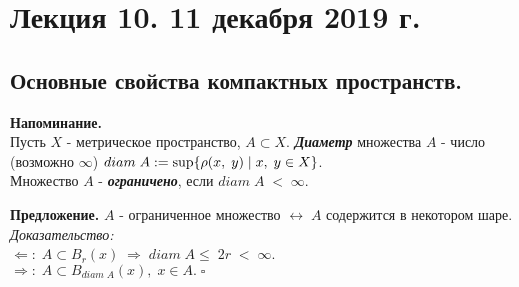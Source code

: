 \documentclass[../../main.tex]{subfiles}
\begin{document}
\section{Лекция 10. 11 декабря 2019 г.}

\subsection{Основные свойства компактных пространств.}
\textbf{Напоминание.}\\
Пусть $X$ - метрическое пространство, $A\subset X$. \textbf{\textit{Диаметр}} множества $A$ - число (возможно $\infty$) $diam\;A := \sup\{\rho(x,\; y)\; |\; x,\;y \in X\}$.\\
Множество $A$ - \textbf{\textit{ограничено}}, если $diam \;A\; <\;\infty$.

\textbf{Предложение.} $A$ - ограниченное множество $\leftrightarrow\; A$ содержится в некотором шаре.\\
\textit{Доказательство:}\\
$\Leftarrow:\; A\subset B_r(x)\; \Rightarrow \;diam\;A \leq\; 2r \;<\; \infty$.\\
$\Rightarrow:\; A\subset B_{diam\;A}(x),\; x\in A.\;\square$
\end{document}
